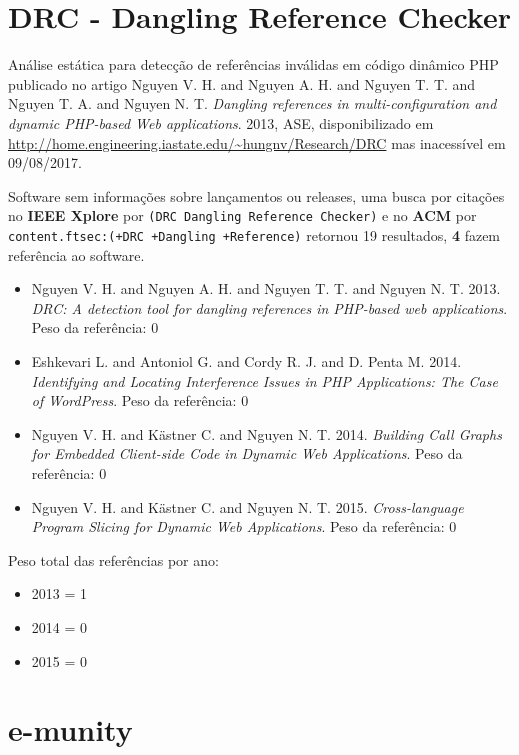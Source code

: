 \section{DRC - Dangling Reference Checker}

Análise estática para detecção de referências inválidas em código dinâmico PHP
publicado no artigo
Nguyen V. H. and Nguyen A. H. and Nguyen T. T. and Nguyen T. A. and Nguyen N. T.
{\it Dangling references in multi-configuration and dynamic PHP-based Web applications}.
2013,
ASE,
disponibilizado em \url{http://home.engineering.iastate.edu/~hungnv/Research/DRC}
mas inacessível em 09/08/2017.

Software sem informações sobre lançamentos ou releases,
uma busca por citações no {\bf IEEE Xplore} por
\texttt{(DRC Dangling Reference Checker)}
e no {\bf ACM} por
\texttt{content.ftsec:(+DRC +Dangling +Reference)}
retornou
19 resultados,
{\bf 4} fazem referência ao software.

\begin{itemize}
\item Nguyen V. H. and Nguyen A. H. and Nguyen T. T. and Nguyen N. T.
      2013.
      {\it DRC: A detection tool for dangling references in PHP-based web applications}.
      Peso da referência: 0
\item Eshkevari L. and Antoniol G. and Cordy R. J. and D. Penta M.
      2014.
      {\it Identifying and Locating Interference Issues in PHP Applications: The Case of WordPress}.
      Peso da referência: 0
\item Nguyen V. H. and K\"{a}stner C. and Nguyen N. T.
      2014.
      {\it Building Call Graphs for Embedded Client-side Code in Dynamic Web Applications}.
      Peso da referência: 0
\item Nguyen V. H. and K\"{a}stner C. and Nguyen N. T.
      2015.
      {\it Cross-language Program Slicing for Dynamic Web Applications}.
      Peso da referência: 0
\end{itemize}

Peso total das referências por ano:

\begin{itemize}
\item 2013 = 1
\item 2014 = 0
\item 2015 = 0
\end{itemize}


\section{e-munity}

